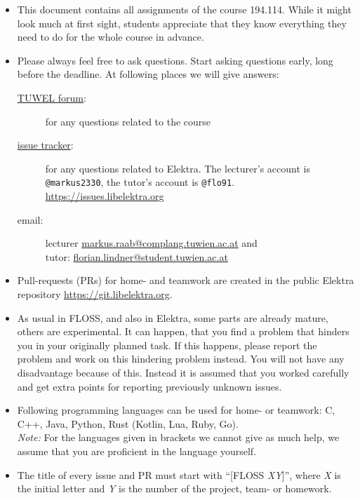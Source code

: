\documentclass[11pt,a4paper]{article}
\def\mynr{194.114}
\def\myterm{2022W}
\newcommand{\anm}[1]{\marginpar{\sffamily\footnotesize\raggedright\color{aktiv}{#1}}}
\newcommand{\languages}[1]{C, C++, Java, Python, Rust (Kotlin, Lua, Ruby, Go)}
\begin{document}
\begin{itemize}
\item This document contains all assignments of the course \mynr.
	While it might look much at first sight, students appreciate that they know everything they need to do for the whole course in advance.
\item Please always feel free to ask questions.
	Start asking questions early, long before the deadline.
	At following places we will give answers:
	\begin{description}
	\item[\href{https://tuwel.tuwien.ac.at/mod/moodleoverflow/view.php?id=1661080}{TUWEL forum}:] for any questions related to the course
	\item[\href{https://issues.libelektra.org}{issue tracker}:] for any questions related to Elektra.
		The lecturer's account is \texttt{@markus2330}, the tutor's account is \texttt{@flo91}.
		\\ \url{https://issues.libelektra.org}
	\item[email:] lecturer \href{mailto:markus.raab@complang.tuwien.ac.at?subject=FLOSS \myterm}{markus.raab@complang.tuwien.ac.at} and \\
		tutor: \href{mailto:florian.lindner@student.tuwien.ac.at?subject=FLOSS \myterm}{florian.lindner@student.tuwien.ac.at}
	\end{description}
\item Pull-requests (PRs) for home- and teamwork are created in the public Elektra repository \url{https://git.libelektra.org}.
\item As usual in FLOSS, and also in Elektra, some parts are already mature, others are experimental.
	It can happen, that you find a problem that hinders you in your originally planned task.
	If this happens, please report the problem and work on this hindering problem instead.
	You will not have any disadvantage because of this.
	Instead it is assumed that you worked carefully and get extra points\anm{Up to 3 extra points.} for reporting previously unknown issues.
\item Following programming languages can be used for home- or teamwork:
	\languages{}. \\
	\textit{Note:} For the languages given in brackets we cannot give as much help, we assume that you are proficient in the language yourself.
\item The title of every issue and PR must start with ``[FLOSS \textit{XY}]'', where \textit{X} is the initial letter and \textit{Y} is the number of the project, team- or homework.

\end{itemize}
\end{document}
